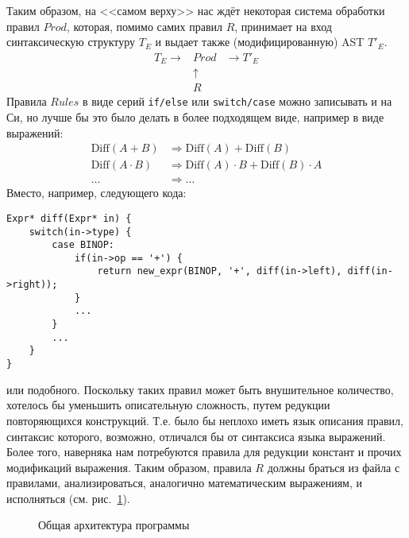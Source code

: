 \documentclass[10pt]{report}
\begin{document}
Таким образом, на <<самом верху>> нас ждёт некоторая система обработки правил $\boxed{Prod}$, которая, помимо самих правил $R$, принимает на вход синтаксическую структуру $T_E$ и выдает также (модифицированную) AST $T'_E$.
$$
\begin{array}{ccc}
	T_E \rightarrow & \boxed{Prod} & \rightarrow T'_E \\
	                &  \uparrow & \\
	                & R & 
\end{array}
$$
Правила $Rules$ в виде серий \texttt{if/else} или \texttt{switch/case} можно записывать и на Си, но лучше бы это было делать в более подходящем виде, например в виде выражений:
\begin{equation}\label{eq:best-form}
\begin{array}{rl}
\mathrm{Diff}(A + B) & \Rightarrow  \mathrm{Diff}(A) + \mathrm{Diff}(B) \\
\mathrm{Diff}(A \cdot B) & \Rightarrow \mathrm{Diff}(A)\cdot B + \mathrm{Diff}(B)\cdot A \\
\ldots & \Rightarrow \ldots
\end{array}
\end{equation}
Вместо, например, следующего кода:
\begin{lstlisting}
Expr* diff(Expr* in) {
	switch(in->type) {
		case BINOP:
			if(in->op == '+') {
				return new_expr(BINOP, '+', diff(in->left), diff(in->right));
			}
			...
		}
		...
	}
}
\end{lstlisting}
или подобного.
Поскольку таких правил может быть внушительное количество, хотелось бы уменьшить описательную сложность, путем редукции повторяющихся конструкций.
 Т.е. было бы неплохо иметь язык описания правил, синтаксис которого, возможно, отличался бы от синтаксиса языка выражений.
 Более того, наверняка нам потребуются правила для редукции констант и прочих модификаций выражения.
  Таким образом, правила $R$ должны браться из файла с правилами, анализироваться, аналогично математическим выражениям, и исполняться (см. рис.~\ref{fig:prod}).
\begin{figure}[b]
\begin{center}
\caption{Общая архитектура программы}
\label{fig:prod}
\end{center}
\end{figure}
\end{document}
